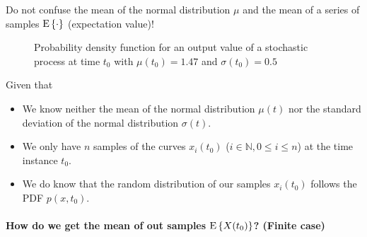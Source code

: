 \begin{refsection}
\begin{attention}
	Do not confuse the mean of the normal distribution $\mu$ and the mean of a series of samples $\mathrm{E}\left\{\cdot\right\}$ (expectation value)!
\end{attention}

\begin{figure}[H]
	\centering
	\caption{Probability density function for an output value of a stochastic process at time $t_0$ with $\mu(t_0) = 1.47$ and $\sigma(t_0) = 0.5$}
\end{figure}

Given that
\begin{itemize}
	\item We know neither the mean of the normal distribution $\mu(t)$ nor the standard deviation of the normal distribution $\sigma(t)$.
	\item We only have $n$ samples of the curves $x_i(t_0)$ ($i \in \mathbb{N}, 0 \leq i \leq n$) at the time instance $t_0$.
	\item We do know that the random distribution of our samples $x_i(t_0)$ follows the \ac{PDF} $p(x, t_0)$.
\end{itemize}

\paragraph{How do we get the mean of out samples $\mathrm{E}\left\{X(t_0)\right\}$? (Finite case)}


\end{refsection}

